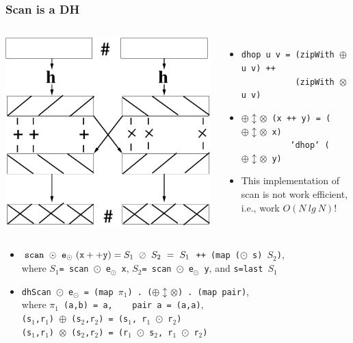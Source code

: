 \documentclass{beamer}
\begin{document}
\begin{frame}[fragile,t]
  \frametitle{Scan is a DH}

\begin{columns}
\includegraphics[height=25ex]{Figures/L2/DH}
\vspace{-3ex}
\begin{itemize}
    \item {\tt dhop u v = (zipWith $\oplus$ u v) ++}\\ 
          {\tt~~~~~~~~~~~(zipWith $\otimes$ u v)}
    \item {\tt $\oplus\updownarrow\otimes$ (x ++ y) = ($\oplus\updownarrow\otimes$ x)}\\
          {\tt~~~~~~~~~~`dhop` ($\oplus\updownarrow\otimes$ y)} 
    \item \alert{This implementation of scan is not work efficient,
                i.e., work $O(N \ lg \ N)$!}
\end{itemize}
\end{columns}


\begin{itemize}
    \item ${\tt scan} \ \odot \ {\tt e}_{\odot} \ {\tt(x++y)} = S_1~\oslash~S_2~=~S_1$
            {\tt ++ (map ($\odot$ s) $S_2$)},\\ 
            where $S_1${\tt = scan $\odot$ e$_{\odot}$ x},
                  $S_2${\tt = scan $\odot$ e$_{\odot}$ y}, and {\tt s=last $S_1$}\medskip
 
    \item {\tt dhScan $\odot$ e$_{\odot}$ = (map $\pi_1$) . ($\oplus\updownarrow\otimes$) . (map pair)},\\
            where {\tt $\pi_1$ (a,b) = a,~~~~pair a = (a,a)},\\
            {\tt (s$_1$,r$_1$) $\oplus$ (s$_2$,r$_2$) = (s$_1$, r$_1$ $\odot$ r$_2$)}\\
            {\tt (s$_1$,r$_1$) $\otimes$ (s$_2$,r$_2$) = (r$_1$ $\odot$ s$_2$, r$_1$ $\odot$ r$_2$)}
\end{itemize}

\end{frame}
\end{document}
